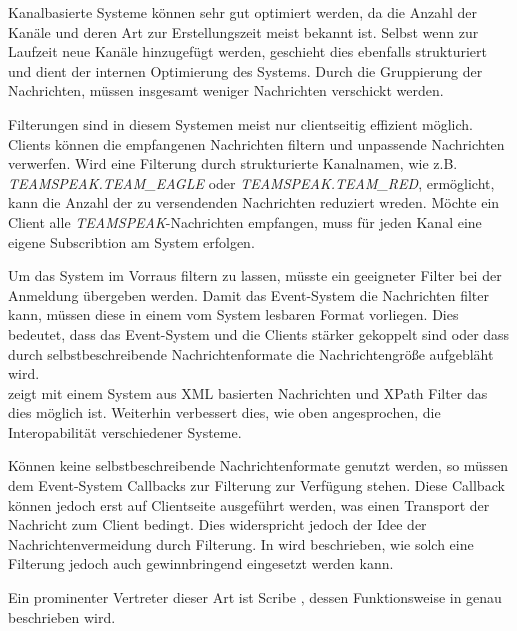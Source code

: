 

Kanalbasierte Systeme können sehr gut optimiert werden, da die Anzahl der Kanäle und deren Art zur Erstellungszeit meist bekannt ist. Selbst wenn zur Laufzeit neue Kanäle hinzugefügt werden, geschieht dies ebenfalls strukturiert und dient der internen Optimierung des Systems. Durch die Gruppierung der Nachrichten, müssen insgesamt weniger Nachrichten verschickt werden.

Filterungen sind in diesem Systemen meist nur clientseitig effizient möglich. Clients können die empfangenen Nachrichten filtern und unpassende Nachrichten verwerfen. Wird eine Filterung durch strukturierte Kanalnamen, wie z.B. \emph{TEAMSPEAK.TEAM\_EAGLE} oder \emph{TEAMSPEAK.TEAM\_RED}, ermöglicht, kann die Anzahl der zu versendenden Nachrichten reduziert wreden. Möchte ein Client alle \emph{TEAMSPEAK}-Nachrichten empfangen, muss für jeden Kanal eine eigene Subscribtion am System erfolgen.

Um das System im Vorraus filtern zu lassen, müsste ein geeigneter Filter bei der Anmeldung übergeben werden. Damit das Event-System die Nachrichten filter kann, müssen diese in einem vom System lesbaren Format vorliegen. Dies bedeutet, dass das Event-System und die Clients stärker gekoppelt sind oder dass durch selbstbeschreibende Nachrichtenformate die Nachrichtengröße aufgebläht wird.\\
\cite{PiEyKoSh2007-PubSubAPI} zeigt mit einem System aus XML basierten Nachrichten und XPath Filter das dies möglich ist. Weiterhin verbessert dies, wie oben angesprochen, die Interopabilität verschiedener Systeme.

Können keine selbstbeschreibende Nachrichtenformate genutzt werden, so müssen dem Event-System Callbacks zur Filterung zur Verfügung stehen. Diese Callback können jedoch erst auf Clientseite ausgeführt werden, was einen Transport der Nachricht zum Client bedingt. Dies widerspricht jedoch der Idee der Nachrichtenvermeidung durch Filterung. In  wird beschrieben, wie solch eine Filterung jedoch auch gewinnbringend eingesetzt werden kann.

Ein prominenter Vertreter dieser Art ist Scribe \cite{Castro2002Scribe}, dessen Funktionsweise in  genau beschrieben wird.

